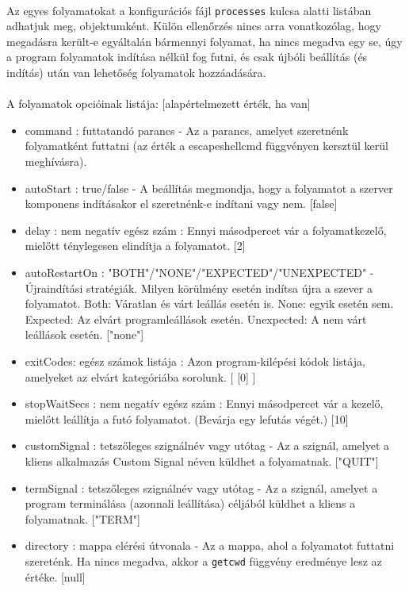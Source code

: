\documentclass[12pt]{report}
\begin{document}
  \paragraph{}
  Az egyes folyamatokat a konfigurációs fájl \verb|processes| kulcsa alatti listában adhatjuk meg, objektumként. Külön ellenőrzés nincs arra vonatkozólag, hogy megadásra került-e egyáltalán bármennyi folyamat, ha nincs megadva egy se, úgy a program folyamatok indítása nélkül fog futni, és csak újbóli beállítás (és indítás) után van lehetőség folyamatok hozzáadására.
    \paragraph{}
  A folyamatok opcióinak listája: [alapértelmezett érték, ha van]
  \begin{itemize}
  \item command : futtatandó parancs - Az a parancs, amelyet szeretnénk folyamatként futtatni (az érték a escapeshellcmd függvényen kersztül kerül meghívásra).
  \item autoStart : true/false - A beállítás megmondja, hogy a folyamatot a szerver komponens indításakor el szeretnénk-e indítani vagy nem. [false]
  \item delay : nem negatív egész szám : Ennyi másodpercet vár a folyamatkezelő, mielőtt ténylegesen elindítja a folyamatot. [2]
  \item autoRestartOn : "BOTH"/"NONE"/"EXPECTED"/"UNEXPECTED" - Újraindítási stratégiák. Milyen körülmény esetén indítsa újra a szever a folyamatot. Both: Váratlan és várt leállás esetén is. None: egyik esetén sem. \pagebreak Expected: Az elvárt programleállások esetén. Unexpected: A nem várt leállások esetén. ["none"]
  \item exitCodes: egész számok listája : Azon program-kilépési kódok listája, amelyeket az elvárt kategóriába sorolunk. [ [0] ]
  \item stopWaitSecs : nem negatív egész szám : Ennyi másodpercet vár a kezelő, mielőtt leállítja a futó folyamatot. (Bevárja egy lefutás végét.) [10]
  \item customSignal : tetszőleges szignálnév vagy utótag - Az a szignál, amelyet a kliens alkalmazás Custom Signal néven küldhet a folyamatnak. ["QUIT"]
  \item termSignal : tetszőleges szignálnév vagy utótag - Az a szignál, amelyet a program terminálása (azonnali leállítása) céljából küldhet a kliens a folyamatnak. ["TERM"]
  \item directory : mappa elérési útvonala - Az a mappa, ahol a folyamatot futtatni szereténk. Ha nincs megadva, akkor a \verb|getcwd| függvény eredménye lesz az értéke. [null]

\end{itemize}
\end{document}
